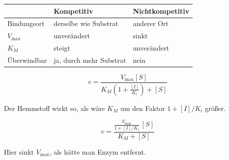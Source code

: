 \begin{merksatz}
\begin{center}
{\small
\renewcommand{\arraystretch}{1.55}
\begin{tabular}{@{}P{2.4cm}P{2.8cm}P{3.0cm}@{}}
\toprule
& \textbf{Kompetitiv} & \textbf{Nichtkompetitiv}\\
\midrule
Bindungsort & derselbe wie Substrat & anderer Ort\\
$V_{\max}$ & \textcolor{gruen}{unverändert} & \textcolor{akzent}{sinkt}\\
$K_M$ & \textcolor{akzent}{steigt} & \textcolor{gruen}{unverändert}\\
Überwindbar & \textcolor{gruen}{ja, durch mehr Substrat} & \textcolor{akzent}{nein}\\
\bottomrule
\end{tabular}}
\end{center}

\[ v = \frac{V_{\max}[S]}{K_M\left(1+\frac{[I]}{K_i}\right) + [S]} \]

Der Hemmstoff wirkt so, als wäre $K_M$ um den Faktor $1+[I]/K_i$ größer.

\[ v = \frac{\frac{V_{\max}}{1+[I]/K_i}\,[S]}{K_M + [S]} \]

Hier sinkt $V_{\max}$, als hätte man Enzym entfernt.
\end{merksatz}

